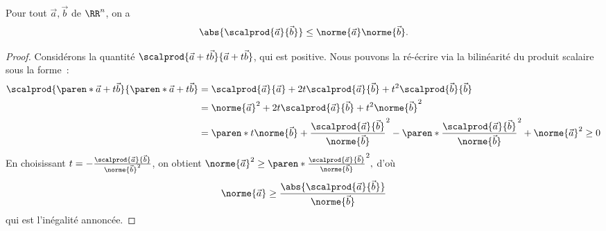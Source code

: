 \begin{frame}
  \begin{proposition}Pour tout \(\vec a, \vec b\) de \(\RR^{n}\), on a 
    \begin{equation*}
      \abs{\scalprod{\vec a}{\vec b}} \leq \norme {\vec a} \norme {\vec b}.
    \end{equation*}
  \end{proposition}
\end{frame}
\begin{frame}
  \begin{proof}
    Considérons la quantité \(\scalprod{\vec a + t \vec b}{\vec a + t \vec b}\), qui est positive.
    \pause Nous pouvons la ré-écrire via la bilinéarité du produit scalaire sous la forme~:
    \begin{align*}
      \scalprod{\paren*{\vec a + t \vec b}}{\paren*{\vec a + t \vec b}} &= \scalprod {\vec a}{\vec a} + 2 t \scalprod{\vec a}{\vec b} + t^{2} \scalprod{\vec b}{\vec b}\\
                                                                        & = \norme{\vec{a}}^{2} + 2 t \scalprod {\vec a}{\vec b} + t^{2} \norme{\vec{b}}^{2} \\
                                                                        & = \paren*{t \norme{\vec{b}} + \frac{\scalprod{\vec a}{\vec b}}{\norme{\vec{b}}}}^{2} - \paren*{\frac{\scalprod{\vec a}{\vec b}}{\norme{\vec{b}}}}^{2} + \norme{\vec{a}}^{2} \geq 0
    \end{align*}\pause
    En choisissant \(t = - \frac{\scalprod {\vec a}{\vec b}}{\norme{\vec{b}}^{2}}\), on obtient
    \begin{math}
      \norme{\vec{a}}^{2} \geq \paren*{\frac{{\scalprod{\vec a}{\vec b}}}{\norme{\vec{b}}}}^{2},
    \end{math}\pause
    d'où
    \begin{equation*}
      \norme{\vec{a}} \geq \frac{\abs{\scalprod{\vec a}{\vec b}}}{\norme{\vec{b}}}
    \end{equation*}
    qui est l'inégalité annoncée.
  \end{proof}
\end{frame}
